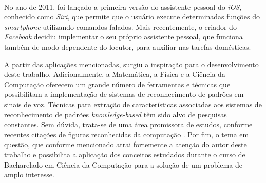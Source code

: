 \documentclass[a4paper,12pt,twoside,openright]{report}
\begin{document}
\\
\par No ano de 2011, foi lan{\c c}ado a primeira vers\~{a}o do assistente pessoal do \textit{iOS}, conhecido como \textit{Siri}, que permite que o usu\'{a}rio execute determinadas fun{\c c}\~{o}es do \textit{smartphone} utilizando comandos falados. Mais recentemente, o criador do \textit{Facebook} decidiu implementar o seu pr\'{o}prio assistente pessoal, que funciona tamb\'{e}m de modo dependente do locutor, para auxiliar nas tarefas dom\'{e}sticas.
\\
\par A partir das aplica\c{c}\~{o}es mencionadas, surgiu a inspira{\c c}\~{a}o para o desenvolvimento deste trabalho. Adicionalmente, a Matem\'{a}tica, a F\'{i}sica e a Ci\^{e}ncia da Computa\c{c}\~{a}o oferecem um grande n\'{u}mero de ferramentas e t\'{e}cnicas que possibilitam a implementa\c{c}\~{a}o de sistemas de reconhecimento de padr\~{o}es em sinais de voz. T\'{e}cnicas para extra\c{c}\~{a}o de caracter\'{i}sticas associadas aos sistemas de reconhecimento de padr\~{o}es \textit{knowledge-based} \cite{deng} t\^{e}m sido alvo de pesquisas constantes. Sem d\'{u}vida, trata-se de uma \'{a}rea promissora de estudos, conforme recentes cita\c{c}\~{o}es de figuras reconhecidas da computa\c{c}\~{a}o \cite{bill}. Por fim, o tema em quest\~{a}o, que conforme mencionado atrai fortemente a aten\c{c}\~{a}o do autor deste trabalho e possibilita a aplica\c{c}\~{a}o dos conceitos estudados durante o curso de Bacharelado em Ci\^{e}ncia da Computa\c{c}\~{a}o para a solu\c{c}\~{a}o de um problema de amplo interesse.
\end{document}
